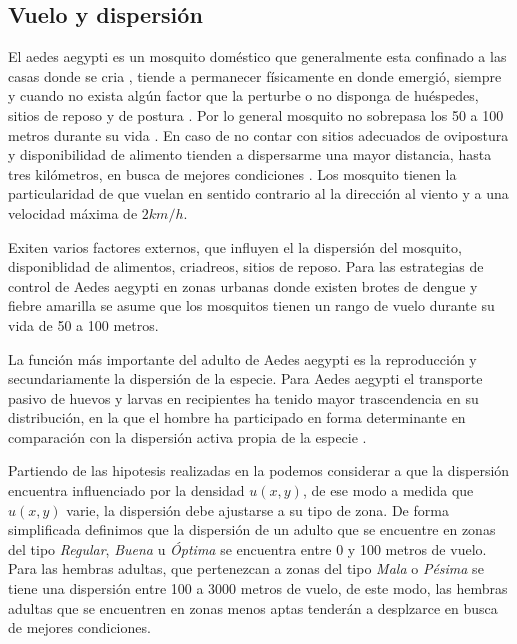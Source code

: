 
\subsection{Vuelo y dispersión}
\label{sec:cap4-vuelo-dispersion}
El aedes aegypti es un mosquito doméstico que generalmente esta confinado a las casas donde se
cria \citep{luevano1993ciclo}, tiende a permanecer físicamente en donde emergió, siempre y cuando
no exista algún factor que la perturbe o no disponga de huéspedes, sitios de reposo y de postura
\citep{ThironIzcazaJ2003}. Por lo general mosquito no sobrepasa los 50 a 100 metros durante su vida
\citep{cabezas2005dengue}. En caso de no contar con sitios adecuados de ovipostura y disponibilidad
de alimento tienden a dispersarme una mayor distancia, hasta tres kilómetros, en busca de
mejores condiciones \citep{ThironIzcazaJ2003}. Los mosquito tienen la particularidad de que vuelan
en sentido contrario al la dirección al viento \citep{ThironIzcazaJ2003} y a una velocidad máxima
de $2 km/h$\citep{kaufmann2004flight}.

Exiten varios factores externos, que influyen el la dispersión del mosquito, disponiblidad de
alimentos, criadreos, sitios de reposo. Para las estrategias de control de Aedes aegypti en zonas
urbanas donde existen brotes de dengue y fiebre amarilla se asume que los mosquitos tienen un
rango de vuelo durante su vida de 50 a 100 metros\citep{dengueUruguayCap8}.

La función más importante del adulto de Aedes aegypti es la reproducción y secundariamente la
dispersión de la especie. Para Aedes aegypti el transporte pasivo de huevos y larvas en
recipientes ha tenido mayor trascendencia en su distribución, en la que el hombre ha participado
en forma determinante en comparación con la dispersión activa propia de la especie
\citep{ThironIzcazaJ2003}.

Partiendo de las hipotesis realizadas en la  podemos considerar a
que la dispersión encuentra influenciado por la densidad $u(x,y)$, de ese modo a medida que
$u(x,y)$ varie, la dispersión debe ajustarse a su tipo de zona. De forma simplificada definimos que
la dispersión de un adulto que se encuentre en zonas del tipo \textit{Regular}, \textit{Buena} u
\textit{Óptima} se encuentra entre 0 y 100 metros de vuelo. Para las hembras adultas, que
pertenezcan a zonas del tipo \textit{Mala} o \textit{Pésima} se tiene una dispersión entre 100 a
3000 metros de vuelo, de este modo, las hembras adultas que se encuentren en zonas menos aptas
tenderán a desplzarce en busca de mejores condiciones.
